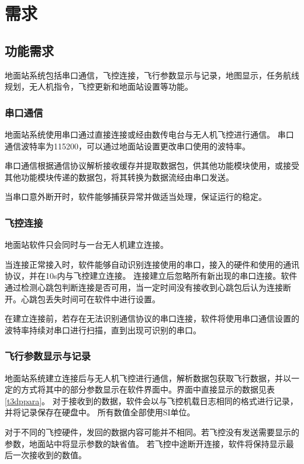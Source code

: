 \section{需求}
\subsection{功能需求}
\label{c31}
地面站系统包括串口通信，飞控连接，飞行参数显示与记录，地图显示，任务航线规划，无人机指令，飞控更新和地面站设置等功能。
\subsubsection{串口通信}
地面站系统使用串口通过直接连接或经由数传电台与无人机飞控进行通信。
串口通信波特率为115200，可以通过地面站设置更改串口使用的波特率。

串口通信根据通信协议解析接收缓存并提取数据包，供其他功能模块使用，或接受其他功能模块传递的数据包，将其转换为数据流经由串口发送。

当串口意外断开时，软件能够捕获异常并做适当处理，保证运行的稳定。

\subsubsection{飞控连接}
地面站软件只会同时与一台无人机建立连接。

当连接正常接入时，软件能够自动识别连接使用的串口，接入的硬件和使用的通讯协议，并在10s内与飞控建立连接。
连接建立后忽略所有新出现的串口连接。软件通过检测心跳包判断连接是否可用，当一定时间没有接收到心跳包后认为连接断开。心跳包丢失时间可在软件中进行设置。

在建立连接前，若存在无法识别通信协议的串口连接，软件将使用串口通信设置的波特率持续对串口进行扫描，直到出现可识别的串口。

\subsubsection{飞行参数显示与记录}
地面站系统建立连接后与无人机飞控进行通信，解析数据包获取飞行数据，并以一定的方式将其中的部分参数显示在软件界面中。界面中直接显示的数据见表\ref{t3dppara}。
对于接收到的数据，软件会以与飞控机载日志相同的格式进行记录，并将记录保存在硬盘中。
所有数值全部使用SI单位。

对于不同的飞控硬件，发回的数据内容可能并不相同。若飞控没有发送需要显示的参数，地面站中将显示参数的缺省值。
若飞控中途断开连接，软件将保持显示最后一次接收到的数值。

